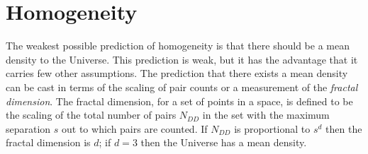 \documentclass[modern]{aastex631}
\begin{document}
\section{Homogeneity}\label{sec:homo}\noindent
The weakest possible prediction of homogeneity is that there should be a mean density to the Universe.
This prediction is weak, but it has the advantage that it carries few other assumptions.
The prediction that there exists a mean density can be cast in terms of the scaling of pair counts or a measurement of the \emph{fractal dimension}.
The fractal dimension, for a set of points in a space, is defined to be the scaling of the total number of pairs $N_{DD}$ in the set with the maximum separation $s$ out to which pairs are counted.
If $N_{DD}$ is proportional to $s^d$ then the fractal dimension is $d$; if $d=3$ then the Universe has a mean density.
\end{document}
